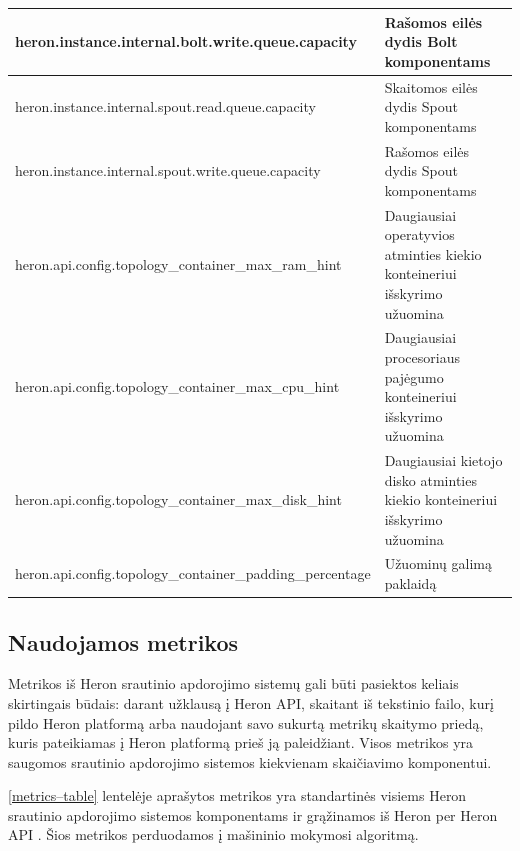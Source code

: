 \documentclass{VUMIFPSbakalaurinis}
\begin{document}
\begin{longtable}{|p{0.59\linewidth}|p{0.41\linewidth}|}
    heron.instance.internal.bolt.write.queue.capacity                     & Rašomos eilės dydis Bolt komponentams                                          \\ \hline
    heron.instance.internal.spout.read.queue.capacity                     & Skaitomos eilės dydis Spout komponentams                                       \\ \hline
    heron.instance.internal.spout.write.queue.capacity                    & Rašomos eilės dydis Spout komponentams                                         \\ \hline
    heron.api.config.topology\_container\_max\_ram\_hint                  & Daugiausiai operatyvios atminties kiekio konteineriui išskyrimo užuomina       \\ \hline
    heron.api.config.topology\_container\_max\_cpu\_hint                  & Daugiausiai procesoriaus pajėgumo konteineriui išskyrimo užuomina              \\ \hline
    heron.api.config.topology\_container\_max\_disk\_hint                 & Daugiausiai kietojo disko atminties kiekio konteineriui išskyrimo užuomina    \\ \hline
    heron.api.config.topology\_container\_padding\_percentage             & Užuominų galimą paklaidą                                                       \\ \hline
\end{longtable}

\subsection{Naudojamos metrikos}
Metrikos iš Heron srautinio apdorojimo sistemų gali būti pasiektos keliais skirtingais būdais: darant užklausą į Heron API, skaitant iš tekstinio failo, kurį pildo Heron platformą arba naudojant savo sukurtą metrikų skaitymo priedą, kuris pateikiamas į Heron platformą prieš ją paleidžiant. Visos metrikos yra saugomos srautinio apdorojimo sistemos kiekvienam skaičiavimo komponentui. 

\ref{metrics–table} lentelėje aprašytos metrikos yra standartinės visiems Heron srautinio apdorojimo sistemos komponentams ir grąžinamos iš Heron per Heron API \cite{heronTracker}. Šios metrikos perduodamos į mašininio mokymosi algoritmą.
\end{document}
